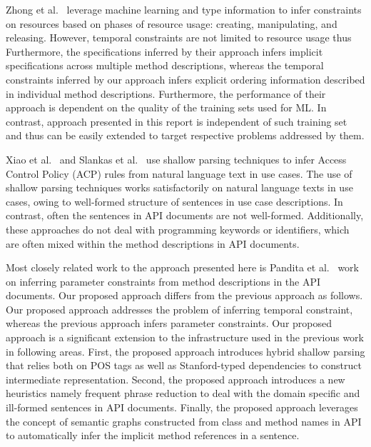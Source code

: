 Zhong et al.~\cite{zhong09SE} leverage machine learning and type information to infer constraints on resources based on phases of resource usage: creating, manipulating, and releasing.
However, temporal constraints are not limited to resource usage thus 
Furthermore, the specifications inferred by their approach infers implicit specifications across multiple method descriptions,
whereas the temporal constraints inferred by our approach infers explicit ordering information described in individual method descriptions.
Furthermore, the performance of their approach is dependent on the quality of the training sets used for ML.
In contrast, approach presented in this report is independent of such training set and thus can be easily extended to target respective problems addressed by them.

Xiao et al.~\cite{XiaoFSE2012} and Slankas et al.~\cite{johnSlankasPASSAT13} use shallow parsing techniques to infer Access Control Policy (ACP) rules from natural language text in use cases.
The use of shallow parsing techniques works satisfactorily on natural language texts in use cases, owing to well-formed structure of sentences in use case descriptions.
In contrast, often the sentences in API documents are not well-formed.
Additionally, these approaches do not deal with programming keywords or identifiers, which are often mixed within the method descriptions in API documents.

Most closely related work to the approach presented here is Pandita et al.~\cite{pandita12:inferring} work on inferring parameter constraints from method descriptions in the API documents.
Our proposed approach differs from the previous approach as follows.
Our proposed approach addresses the problem of inferring temporal constraint, whereas the previous approach infers parameter constraints.
Our proposed approach is a significant extension to the infrastructure used in the previous work in following areas.
First, the proposed approach introduces hybrid shallow parsing that relies both on POS tags as well as Stanford-typed dependencies to construct intermediate representation.
Second, the proposed approach introduces a new heuristics namely frequent phrase reduction to deal with the domain specific and ill-formed sentences in API documents.
Finally, the proposed approach leverages the concept of semantic graphs constructed from class and method names in API to automatically infer the implicit method references in a sentence.   


